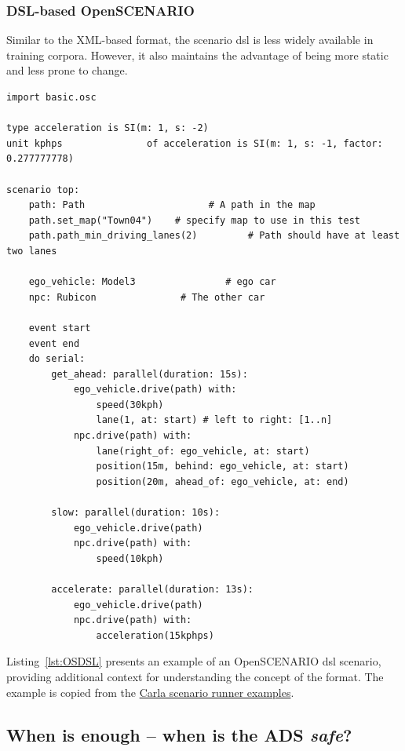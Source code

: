 \newpage %

\subsubsection{DSL-based OpenSCENARIO}

Similar to the XML-based format, the scenario \acrshort{dsl} is less widely
available in training corpora. However, it also maintains the advantage of being
more static and less prone to change.


\begin{lstlisting}[label={lst:OSDSL}, caption={An example of an OpenSCENARIO DSL scenario.}]
import basic.osc

type acceleration is SI(m: 1, s: -2)
unit kphps               of acceleration is SI(m: 1, s: -1, factor: 0.277777778)

scenario top:
    path: Path                      # A path in the map
    path.set_map("Town04")    # specify map to use in this test
    path.path_min_driving_lanes(2)         # Path should have at least two lanes

    ego_vehicle: Model3                # ego car
    npc: Rubicon               # The other car

    event start
    event end
    do serial:
        get_ahead: parallel(duration: 15s):
            ego_vehicle.drive(path) with:
                speed(30kph)
                lane(1, at: start) # left to right: [1..n]
            npc.drive(path) with:
                lane(right_of: ego_vehicle, at: start)
                position(15m, behind: ego_vehicle, at: start)
                position(20m, ahead_of: ego_vehicle, at: end)       

        slow: parallel(duration: 10s):
            ego_vehicle.drive(path)
            npc.drive(path) with:
                speed(10kph)

        accelerate: parallel(duration: 13s):
            ego_vehicle.drive(path)
            npc.drive(path) with:
                acceleration(15kphps)
\end{lstlisting}

Listing~\ref{lst:OSDSL} presents an example of an OpenSCENARIO \acrshort{dsl} scenario, providing
additional context for understanding the concept of the format. The example is copied
from the \href{https://github.com/carla-simulator/scenario_runner/blob/master/srunner/examples/acceleration.osc}{Carla scenario runner examples}.

\subsection{When is enough -- when is the ADS \emph{safe}?}\label{sec:adsInduction}

